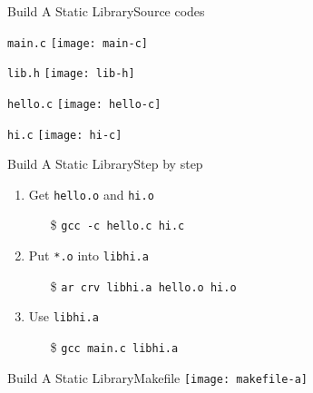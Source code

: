 \begin{frame}{Build A Static Library}{Source codes}
  \begin{minipage}[t]{.47\linewidth}
    \begin{block}{\texttt{main.c}}
      \texttt{[image: main-c]}
    \end{block}
    \begin{block}{\texttt{lib.h}}
      \texttt{[image: lib-h]}
    \end{block}
  \end{minipage}\qquad
  \begin{minipage}[t]{.43\linewidth}
    \begin{block}{\texttt{hello.c}}
      \texttt{[image: hello-c]}
    \end{block}
    \begin{block}{\texttt{hi.c}}
      \texttt{[image: hi-c]}
    \end{block}
  \end{minipage}
\end{frame}

\begin{frame}{Build A Static Library}{Step by step}
  \begin{enumerate}
  \item Get \alert{\texttt{hello.o}} and \alert{\texttt{hi.o}}
    \begin{itemize}
    \item[\$] \texttt{gcc -c hello.c hi.c}
    \end{itemize}
  \item Put \alert{\texttt{*.o}} into \alert{\texttt{libhi.a}}
    \begin{itemize}
    \item[\$] \texttt{ar crv libhi.a hello.o hi.o}
    \end{itemize}
  \item Use \alert{\texttt{libhi.a}}
    \begin{itemize}
    \item[\$] \texttt{gcc main.c libhi.a}
    \end{itemize}
  \end{enumerate}
\end{frame}

\begin{frame}{Build A Static Library}{Makefile}
  \texttt{[image: makefile-a]}
\end{frame}

